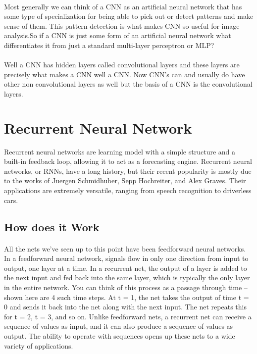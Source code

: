 \documentclass{article}
\begin{document}
    \paragraph{}
    Most generally we can think of a CNN as an artificial neural network that has some type of specialization for being able to pick out or detect patterns and make sense of them. This pattern detection is what makes CNN so useful for image analysis.So if a CNN is just some form of an artificial neural network what differentiates it from just a standard multi-layer perceptron or MLP?
    \paragraph{} 
    Well a CNN has hidden layers called convolutional layers and these layers are precisely what makes a CNN well a CNN. Now CNN's can and usually do have other non convolutional layers as well but the basis of a CNN is the convolutional layers.
    \vspace{20mm}
  \section{Recurrent Neural Network}
  Recurrent neural networks are learning model with a simple structure  and a built-in feedback loop, allowing it  to act as a forecasting engine. 
  Recurrent neural networks, or RNNs, have  a long history, but their recent popularity  is mostly due to the works of Juergen Schmidhuber,  Sepp Hochreiter, and Alex Graves. Their applications  are extremely versatile, ranging from speech  recognition to driverless cars.
  \subsection{How does it Work}
    \paragraph{}
    All the nets we’ve seen up to this point  have been feedforward neural networks. In  a feedforward neural network, signals flow  in only one direction from input to output,  one layer at a time. In a recurrent net, the  output of a layer is added to the next input  and fed back into the same layer, which is  typically the only layer in the entire network.  You can think of this process as a passage  through time – shown here are 4 such time  steps. At t = 1, the net takes the output  of time t = 0 and sends it back into the net  along with the next input. The net repeats  this for t = 2, t = 3, and so on.  Unlike feedforward nets, a recurrent net can  receive a sequence of values as input, and  it can also produce a sequence of values as  output. The ability to operate with sequences  opens up these nets to a wide variety of applications.
\end{document}
